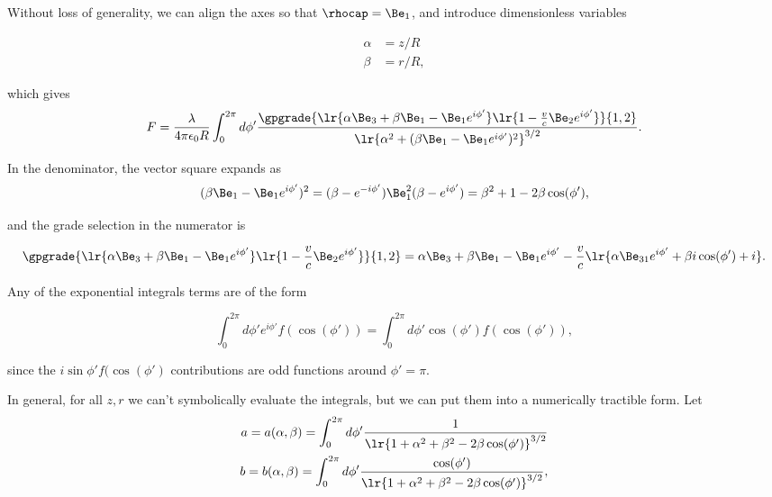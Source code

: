 Without loss of generality, we can align the axes so that \( \rhocap = \Be_1 \), and
introduce dimensionless variables

\begin{dmath}\label{eqn:ringField:100}
\begin{aligned}
\alpha &= z/R \\
\beta &= r/R,
\end{aligned}
\end{dmath}

which gives
\begin{dmath}\label{eqn:ringField:120}
F
= \frac{\lambda}{4 \pi \epsilon_0 R} \int_0^{2\pi} d\phi' \frac{\gpgrade{ \lr{ \alpha \Be_3 + \beta \Be_1 - \Be_1 e^{i\phi'} } \lr{ 1 - \frac{v}{c} \Be_2 e^{i\phi'} } }{1,2} } { \lr{ \alpha^2 + (\beta \Be_1 - \Be_1 e^{i\phi'})^2}^{3/2} }.
\end{dmath}

In the denominator, the vector square expands as
\begin{dmath}\label{eqn:ringField:140}
(\beta \Be_1 - \Be_1 e^{i\phi'})^2
=
(\beta - e^{-i\phi'}) \Be_1^2 (\beta - e^{i\phi'})
=
\beta^2 + 1 - 2 \beta \cos(\phi'),
\end{dmath}

and the grade selection in the numerator is

\begin{dmath}\label{eqn:ringField:160}
\gpgrade{ \lr{ \alpha \Be_3 + \beta \Be_1 - \Be_1 e^{i\phi'} } \lr{ 1 - \frac{v}{c} \Be_2 e^{i\phi'}}}{1,2}
=
\alpha \Be_3 + \beta \Be_1 - \Be_1 e^{i\phi'}
-\frac{v}{c}\lr{ \alpha \Be_{31} e^{i\phi'} + \beta i \cos(\phi') + i }.
\end{dmath}

Any of the exponential integrals terms
are of the form

\begin{dmath}\label{eqn:ringField:180}
\int_0^{2\pi} d\phi' e^{i\phi'} f(\cos(\phi')) = \int_0^{2\pi} d\phi' \cos(\phi') f(\cos(\phi')),
\end{dmath}

since
the \( i \sin\phi' f(\cos(\phi') \) contributions are odd functions around \( \phi' = \pi \).

In general, for all \( z, r \) we can't symbolically evaluate the integrals, but we can put them into a numerically tractible form.
Let
\begin{dmath}\label{eqn:ringField:200}
\begin{aligned}
a = a(\alpha, \beta) = \int_0^{2\pi} d\phi' \frac{1}{\lr{ 1 + \alpha^2 + \beta^2 - 2 \beta \cos(\phi') }^{3/2}} \\
b = b(\alpha, \beta) = \int_0^{2\pi} d\phi' \frac{\cos(\phi')}{\lr{ 1 + \alpha^2 + \beta^2 - 2 \beta \cos(\phi') }^{3/2}},
\end{aligned}
\end{dmath}


